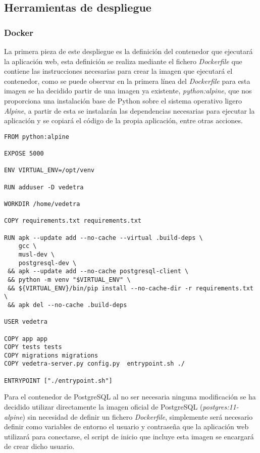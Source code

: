 \documentclass[../proyecto.tex]{subfiles}
\begin{document}
{{{\subsection{Herramientas de despliegue}

\subsubsection{Docker}

La primera pieza de este despliegue es la definición del contenedor que ejecutará la aplicación web, esta definición se realiza mediante el fichero \textit{Dockerfile} que contiene las instrucciones necesarias para crear la imagen que ejecutará el contenedor, como se puede observar en la primera línea del \textit{Dockerfile} para esta imagen se ha decidido partir de una imagen ya existente, \textit{python:alpine}, que nos proporciona una instalación base de Python sobre el sistema operativo ligero \textit{Alpine}, a partir de esta se instalarán las dependencias necesarias para ejecutar la aplicación y se copiará el código de la propia aplicación, entre otras acciones.\\

\begin{minipage}{\linewidth}
\begin{lstlisting}[caption=Dockerfile del servidor web, captionpos=b, frame=single]
FROM python:alpine

EXPOSE 5000

ENV VIRTUAL_ENV=/opt/venv

RUN adduser -D vedetra

WORKDIR /home/vedetra

COPY requirements.txt requirements.txt

RUN apk --update add --no-cache --virtual .build-deps \
    gcc \
    musl-dev \
    postgresql-dev \
 && apk --update add --no-cache postgresql-client \
 && python -m venv "$VIRTUAL_ENV" \
 && ${VIRTUAL_ENV}/bin/pip install --no-cache-dir -r requirements.txt \
 && apk del --no-cache .build-deps

USER vedetra

COPY app app
COPY tests tests
COPY migrations migrations
COPY vedetra-server.py config.py  entrypoint.sh ./

ENTRYPOINT ["./entrypoint.sh"]
\end{lstlisting}
\end{minipage}

Para el contenedor de PostgreSQL al no ser necesaria ninguna modificación se ha decidido utilizar directamente la imagen oficial de PostgreSQL (\textit{postgres:11-alpine}) sin necesidad de definir un fichero \textit{Dockerfile}, simplemente será necesario definir como variables de entorno el usuario y contraseña que la aplicación web utilizará para conectarse, el script de inicio que incluye esta imagen se encargará de crear dicho usuario.\\

}}}
\end{document}
